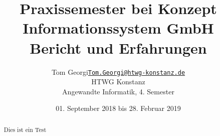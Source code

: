 \documentclass[xcolor=dvipsnames,11pt,paper=a4paper]{report}
\title{
	\Huge\textbf{Praxissemester bei Konzept Informationssystem GmbH}\\\vspace{20pt}
	\huge{Bericht und Erfahrungen}
}
\author{
	\begin{tabular}{l l}
	Tom Georgi &
	\href{mailto:Tom.Georgi@htwg-konstanz.de}{\texttt{Tom.Georgi@htwg-konstanz.de}}\\
	&HTWG Konstanz\\
	&Angewandte Informatik, 4. Semester
	\end{tabular}
}
\date{01. September 2018 bis 28. Februar 2019}
\begin{document}

\begin{titlepage}
\begin{tabular}{l r}
\end{tabular}
{\let\newpage\relax\maketitle}
\end{titlepage}

\begin{abstract}
Dies ist ein Test
\pagebreak
\end{abstract}
\tableofcontents
\pagebreak

\begingroup
\let\clearpage\relax
\lstlistoflistings
\listoffigures
\listoftables
\endgroup
\pagebreak

%



%


%


%

%

%


\end{document}
